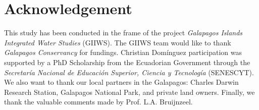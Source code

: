 \documentclass[a4paper,12pt]{article}
\begin{document}
\section{Acknowledgement}
This study has been conducted in the frame of the project \textit{Galapagos Islands Integrated Water Studies} (GIIWS). The GIIWS team would like to thank \textit{Galapagos Conservancy} for fundings. Christian Domínguez participation was supported by a PhD Scholarship from the Ecuadorian Government through the \textit{Secretaría Nacional de Educación Superior, Ciencia y Tecnología} (SENESCYT). We also want to thank our local partners in the Galapagos: Charles Darwin Research Station, Galapagos National Park, and private land owners. Finally, we thank the valuable comments made by Prof. L.A. Bruijnzeel.

\newpage


\end{document}
